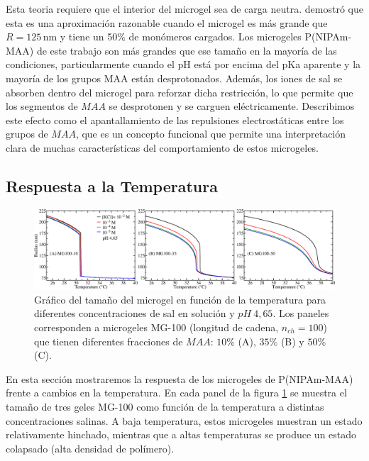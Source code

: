 Esta teoria requiere que el interior del microgel sea de carga neutra.
\citet{Claudio2009} demostr\'o que esta es una aproximaci\'on razonable cuando el microgel es m\'as grande que $R=125\,\text{nm}$ y tiene un 50\% de mon\'omeros cargados.
Los microgeles P(NIPAm-MAA) de este trabajo son m\'as grandes que ese tama\~no en la mayor\'ia de las condiciones, particularmente cuando el pH est\'a por encima del pKa aparente y la mayor\'ia de los grupos MAA est\'an desprotonados.
Adem\'as, los iones de sal se absorben dentro del microgel para reforzar dicha restricci\'on, lo que permite que los segmentos de $MAA$ se desprotonen y se carguen el\'ectricamente.
Describimos este efecto como el apantallamiento de las repulsiones electrost\'aticas entre los grupos de  $MAA$, que es un concepto funcional que permite una interpretaci\'on clara de muchas caracter\'isticas del comportamiento de estos microgeles. %




\subsection{Respuesta a la Temperatura}\label{sec:gel:temperature}

\begin{figure}[!htb]
	\centering
	\includegraphics[width=1\linewidth]{Figures/graph-gel/R-T.png}
	\caption{Gr\'afico del tama\~no del microgel en funci\'on de la temperatura para diferentes concentraciones de sal en soluci\'on y $pH~4,65$.
		Los paneles corresponden a microgeles MG-100 (longitud de cadena, $n_{ch}=100$) que tienen diferentes fracciones de $MAA$: $10\%$ (A), $35\%$ (B) y $50\%$ (C).}
	\label{fig:gel:R-T}
\end{figure}


En esta secci\'on mostraremos la respuesta de los microgeles de P(NIPAm-MAA) frente a cambios en la temperatura.
En cada panel de la figura \ref{fig:gel:R-T} se muestra el tama\~no de tres geles MG-100 como funci\'on de la temperatura a distintas concentraciones salinas.
A baja temperatura, estos microgeles muestran un estado relativamente hinchado, mientras que a altas temperaturas se produce un estado colapsado (alta densidad de pol\'imero).


